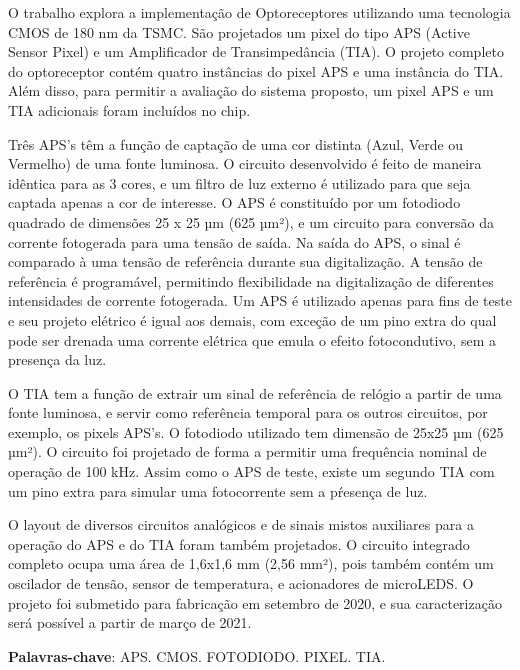
\setlength{\absparsep}{18pt} %
\begin{resumo}

O trabalho explora a implementação de Optoreceptores utilizando uma tecnologia CMOS de 180 nm da TSMC. São projetados um pixel do tipo APS (Active Sensor Pixel) e
um Amplificador de Transimpedância (TIA). O projeto completo do optoreceptor contém quatro instâncias do pixel APS e uma instância do TIA. Além disso, para permitir a avaliação do sistema proposto, um pixel APS e um TIA adicionais foram incluídos no chip.

Três APS’s t\^em a função de captação de uma cor distinta (Azul, Verde ou Vermelho) de uma fonte luminosa. O circuito desenvolvido é feito de maneira idêntica para as 3 cores, e um filtro de luz externo é utilizado para que seja captada apenas a cor de interesse. O APS é constituído por um fotodiodo quadrado de dimensões 25 x 25 µm (625 µm²), e um circuito para conversão da corrente fotogerada para uma tensão de saída. Na saída do APS, o sinal é comparado à uma tensão de referência durante sua digitalização. A tensão de referência é programável, permitindo flexibilidade na digitalização de diferentes intensidades de corrente fotogerada. Um APS é utilizado apenas para fins de teste e seu projeto elétrico é igual aos demais, com exceção de um pino extra do qual pode ser drenada uma corrente elétrica que emula o efeito fotocondutivo, sem a presença da luz.

O TIA tem a função de extrair um sinal de referência de relógio a partir de uma fonte luminosa, e servir como referência temporal para os outros circuitos, por exemplo, os pixels APS’s. O fotodiodo utilizado tem dimensão de 25x25 µm (625 µm²). O circuito foi projetado de forma a permitir uma frequência nominal de operação de 100 kHz. Assim como o APS de teste, existe um segundo TIA com um pino extra para simular uma fotocorrente sem a pŕesença de luz.

O layout de diversos circuitos analógicos e de sinais mistos auxiliares para a operação do APS e do TIA foram também projetados. O circuito integrado completo ocupa uma área de 1,6x1,6 mm (2,56 mm²), pois também contém um oscilador de tensão, sensor de temperatura, e acionadores de microLEDS. O projeto foi submetido para fabricação em setembro de 2020, e sua caracterização será possível a partir de março de 2021.


 \textbf{Palavras-chave}: APS. CMOS. FOTODIODO. PIXEL. TIA.
\end{resumo}